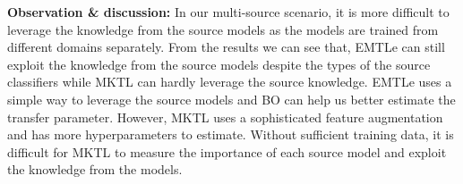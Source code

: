 \textbf{Observation \& discussion:} In our multi-source scenario, it is more difficult to leverage the knowledge from the source models as the models are trained from different domains separately. From the results we can see that, EMTLe can still exploit the knowledge from the source models despite the types of the source classifiers while MKTL can hardly leverage the source knowledge. EMTLe uses a simple way to leverage the source models and BO can help us better estimate the transfer parameter. However, MKTL uses a sophisticated feature augmentation and has more hyperparameters to estimate. Without sufficient training data, it is difficult for MKTL to measure the importance of each source model and exploit the knowledge from the models.




